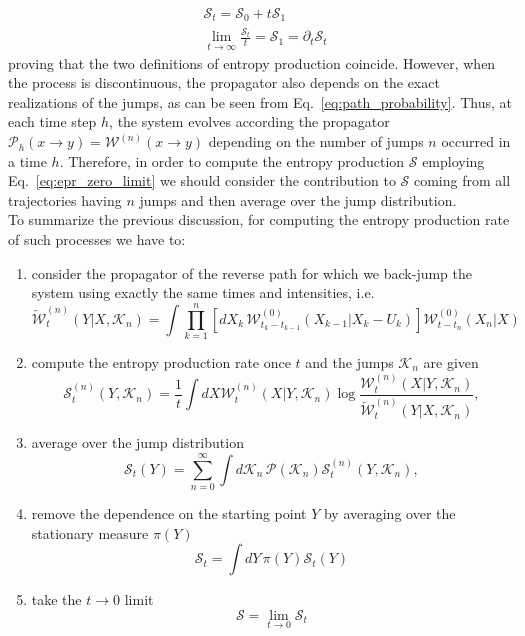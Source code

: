 \documentclass[12pt]{iopart}
\newcommand{\lx} {\left}
\newcommand{\rx} {\right}
\newcommand{\cP} {\mathcal{P}}
\newcommand{\cW} {\mathcal{W}}
\newcommand{\cS} {\mathcal{S}}
\newcommand{\cK} {\mathcal{K}}
\begin{document}
\begin{eqnarray}
    &\cS_t = \cS_0 + t \cS_1 \\
    &\lim_{t\to\infty} \frac{\cS_t}{t} = \cS_1 = \partial_t \cS_t
\end{eqnarray}
proving that the two definitions of entropy production coincide. However, when the process is discontinuous, the propagator also depends on the exact realizations of the jumps, as can be seen from Eq.~\ref{eq:path_probability}. Thus, at each time step $h$, the system evolves according  the propagator $\cP_h(x \to y)=\cW^{(n)}(x \to y)$ depending on the number of jumps $n$ occurred in a time $h$. Therefore, in order to compute the entropy production $\cS$ employing Eq.~\ref{eq:epr_zero_limit} we should consider the contribution to $\cS$ coming from all trajectories having $n$ jumps and then average over the jump distribution.\\ 
To summarize the previous discussion, for computing the entropy production rate of such processes we have to:
\begin{enumerate}
\item consider the propagator of the reverse path for which we back-jump the system using exactly the same times and intensities, i.e.
\begin{equation}
\overleftarrow{\cW}^{(n)}_t(Y|X,\cK_n) = \int \prod_{k=1}^n \lx[ dX_k \, \cW^{(0)}_{t_k - t_{k-1}}( X_{k-1}|X_k-U_k ) \rx] \cW^{(0)}_{t-t_n}(X_n|X)
\end{equation}
\item compute the entropy production rate once $t$ and the jumps $\cK_n$ are given
\begin{equation}
\cS^{(n)}_t(Y,\cK_n) = \frac{1}{t} \int dX \cW^{(n)}_t(X|Y,\cK_n) \log\frac{\cW^{(n)}_t(X|Y,\cK_n)}{\overleftarrow{\cW}^{(n)}_t(Y|X,\cK_n)},
\end{equation}
\item average over the jump distribution
\begin{equation}
\cS_t(Y) = \sum_{n=0}^\infty \int d\cK_n\, \cP(\cK_n) \cS^{(n)}_t(Y,\cK_n),
\end{equation}
\item remove the dependence on the starting point $Y$ by averaging over the stationary measure $\pi(Y)$
\begin{equation}
\cS_t = \int dY\, \pi(Y) \cS_t(Y)
\end{equation}
\item take the $t\to 0$ limit
\begin{equation}
\cS = \lim_{t\to0} \cS_t
\end{equation}
\end{enumerate}
\end{document}

